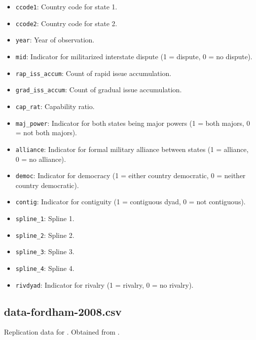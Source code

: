 \documentclass[12pt]{article}
\begin{document}
\begin{itemize}
  \item \texttt{ccode1}: Country code for state 1.
  \item \texttt{ccode2}: Country code for state 2.
  \item \texttt{year}: Year of observation.
  \item \texttt{mid}: Indicator for militarized interstate dispute (1 = dispute, 0 = no dispute).
  \item \texttt{rap\_iss\_accum}: Count of rapid issue accumulation.
  \item \texttt{grad\_iss\_accum}: Count of gradual issue accumulation.
  \item \texttt{cap\_rat}: Capability ratio.
  \item \texttt{maj\_power}: Indicator for both states being major powers (1 = both majors, 0 = not both majors).
  \item \texttt{alliance}: Indicator for formal military alliance between states (1 = alliance, 0 = no alliance).
  \item \texttt{democ}: Indicator for democracy (1 = either country democratic, 0 = neither country democratic).
  \item \texttt{contig}: Indicator for contiguity (1 = contiguous dyad, 0 = not contiguous).
  \item \texttt{spline\_1}: Spline 1.
  \item \texttt{spline\_2}: Spline 2.
  \item \texttt{spline\_3}: Spline 3.
  \item \texttt{spline\_4}: Spline 4. 
  \item \texttt{rivdyad}: Indicator for rivalry (1 = rivalry, 0 = no rivalry).
\end{itemize}

\subsection{data-fordham-2008.csv}

Replication data for \citet{Fordham:2008gs}.
Obtained from \citet{fordham2008data}.
\end{document}
